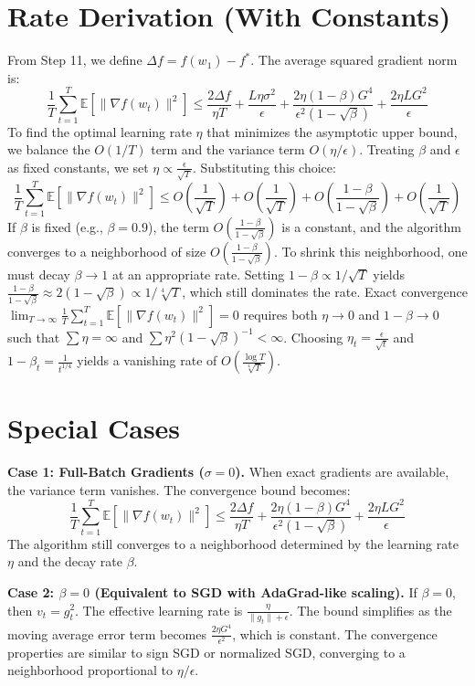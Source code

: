 \documentclass{article}
\begin{document}
\section*{Rate Derivation (With Constants)}
From Step 11, we define $\Delta f = f(w_1) - f^*$. The average squared gradient norm is:
$$ \frac{1}{T} \sum_{t=1}^T \mathbb{E}[\|\nabla f(w_t)\|^2] \leq \frac{2 \Delta f}{\eta T} + \frac{L\eta\sigma^2}{\epsilon} + \frac{2\eta(1-\beta)G^4}{\epsilon^2(1-\sqrt{\beta})} + \frac{2\eta L G^2}{\epsilon} $$
To find the optimal learning rate $\eta$ that minimizes the asymptotic upper bound, we balance the $O(1/T)$ term and the variance term $O(\eta/\epsilon)$. Treating $\beta$ and $\epsilon$ as fixed constants, we set $\eta \propto \frac{\epsilon}{\sqrt{T}}$. Substituting this choice:
$$ \frac{1}{T} \sum_{t=1}^T \mathbb{E}[\|\nabla f(w_t)\|^2] \leq O\left(\frac{1}{\sqrt{T}}\right) + O\left(\frac{1}{\sqrt{T}}\right) + O\left(\frac{1-\beta}{1-\sqrt{\beta}}\right) + O\left(\frac{1}{\sqrt{T}}\right) $$
If $\beta$ is fixed (e.g., $\beta = 0.9$), the term $O\left(\frac{1-\beta}{1-\sqrt{\beta}}\right)$ is a constant, and the algorithm converges to a neighborhood of size $O\left(\frac{1-\beta}{1-\sqrt{\beta}}\right)$. To shrink this neighborhood, one must decay $\beta \to 1$ at an appropriate rate. Setting $1-\beta \propto 1/\sqrt{T}$ yields $\frac{1-\beta}{1-\sqrt{\beta}} \approx 2(1-\sqrt{\beta}) \propto 1/\sqrt[4]{T}$, which still dominates the rate. Exact convergence $\lim_{T \to \infty} \frac{1}{T} \sum_{t=1}^T \mathbb{E}[\|\nabla f(w_t)\|^2] = 0$ requires both $\eta \to 0$ and $1-\beta \to 0$ such that $\sum \eta = \infty$ and $\sum \eta^2 (1-\sqrt{\beta})^{-1} < \infty$. Choosing $\eta_t = \frac{\epsilon}{\sqrt{t}}$ and $1-\beta_t = \frac{1}{t^{1/4}}$ yields a vanishing rate of $O\left(\frac{\log T}{\sqrt[4]{T}}\right)$.

\section*{Special Cases}
\textbf{Case 1: Full-Batch Gradients ($\sigma = 0$).} When exact gradients are available, the variance term vanishes. The convergence bound becomes:
$$ \frac{1}{T} \sum_{t=1}^T \mathbb{E}[\|\nabla f(w_t)\|^2] \leq \frac{2 \Delta f}{\eta T} + \frac{2\eta(1-\beta)G^4}{\epsilon^2(1-\sqrt{\beta})} + \frac{2\eta L G^2}{\epsilon} $$
The algorithm still converges to a neighborhood determined by the learning rate $\eta$ and the decay rate $\beta$.

\textbf{Case 2: $\beta = 0$ (Equivalent to SGD with AdaGrad-like scaling).} If $\beta = 0$, then $v_t = g_t^2$. The effective learning rate is $\frac{\eta}{\|g_t\| + \epsilon}$. The bound simplifies as the moving average error term becomes $\frac{2\eta G^4}{\epsilon^2}$, which is constant. The convergence properties are similar to sign SGD or normalized SGD, converging to a neighborhood proportional to $\eta/\epsilon$.
\end{document}
